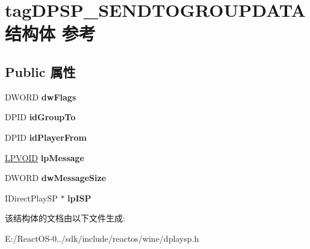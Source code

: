 \hypertarget{structtag_d_p_s_p___s_e_n_d_t_o_g_r_o_u_p_d_a_t_a}{}\section{tag\+D\+P\+S\+P\+\_\+\+S\+E\+N\+D\+T\+O\+G\+R\+O\+U\+P\+D\+A\+T\+A结构体 参考}
\label{structtag_d_p_s_p___s_e_n_d_t_o_g_r_o_u_p_d_a_t_a}
\subsection*{Public 属性}
\begin{DoxyCompactItemize}
\item 
\mbox{\label{structtag_d_p_s_p___s_e_n_d_t_o_g_r_o_u_p_d_a_t_a_af72d9a2957bb4b8a3e8ddadc999a95de}} 
D\+W\+O\+RD {\bfseries dw\+Flags}
\item 
\mbox{\label{structtag_d_p_s_p___s_e_n_d_t_o_g_r_o_u_p_d_a_t_a_a7eed4306b668a865082590b5507e2d07}} 
D\+P\+ID {\bfseries id\+Group\+To}
\item 
\mbox{\label{structtag_d_p_s_p___s_e_n_d_t_o_g_r_o_u_p_d_a_t_a_a3e5b428c4e221a7e02462c0780beeead}} 
D\+P\+ID {\bfseries id\+Player\+From}
\item 
\mbox{\label{structtag_d_p_s_p___s_e_n_d_t_o_g_r_o_u_p_d_a_t_a_a987988f340b7efb1771acbd54df4cd10}} 
\hyperlink{interfacevoid}{L\+P\+V\+O\+ID} {\bfseries lp\+Message}
\item 
\mbox{\label{structtag_d_p_s_p___s_e_n_d_t_o_g_r_o_u_p_d_a_t_a_ab93d815041fc05fe4f9fc4cc6cc9a1c5}} 
D\+W\+O\+RD {\bfseries dw\+Message\+Size}
\item 
\mbox{\label{structtag_d_p_s_p___s_e_n_d_t_o_g_r_o_u_p_d_a_t_a_ab4d1ed980b62081720430459037b76a9}} 
I\+Direct\+Play\+SP $\ast$ {\bfseries lp\+I\+SP}
\end{DoxyCompactItemize}


该结构体的文档由以下文件生成\+:\begin{DoxyCompactItemize}
\item 
E\+:/\+React\+O\+S-\/0../sdk/include/reactos/wine/dplaysp.\+h\end{DoxyCompactItemize}
